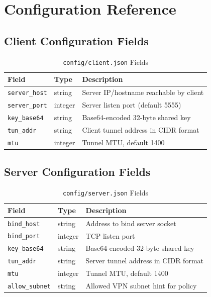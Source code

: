 \chapter{Configuration Reference}

\section{Client Configuration Fields}
\begin{table}[H]
\centering
\caption{\texttt{config/client.json} Fields}
\begin{tabular}{p{}p{}p{}}
\toprule
\textbf{Field} & \textbf{Type} & \textbf{Description} \\
\midrule
\texttt{server\_host} & string & Server IP/hostname reachable by client \\
\texttt{server\_port} & integer & Server listen port (default 5555) \\
\texttt{key\_base64} & string & Base64-encoded 32-byte shared key \\
\texttt{tun\_addr} & string & Client tunnel address in CIDR format \\
\texttt{mtu} & integer & Tunnel MTU, default 1400 \\
\bottomrule
\end{tabular}
\end{table}

\section{Server Configuration Fields}
\begin{table}[H]
\centering
\caption{\texttt{config/server.json} Fields}
\begin{tabular}{p{}p{}p{}}
\toprule
\textbf{Field} & \textbf{Type} & \textbf{Description} \\
\midrule
\texttt{bind\_host} & string & Address to bind server socket \\
\texttt{bind\_port} & integer & TCP listen port \\
\texttt{key\_base64} & string & Base64-encoded 32-byte shared key \\
\texttt{tun\_addr} & string & Server tunnel address in CIDR format \\
\texttt{mtu} & integer & Tunnel MTU, default 1400 \\
\texttt{allow\_subnet} & string & Allowed VPN subnet hint for policy \\
\bottomrule
\end{tabular}
\end{table}


